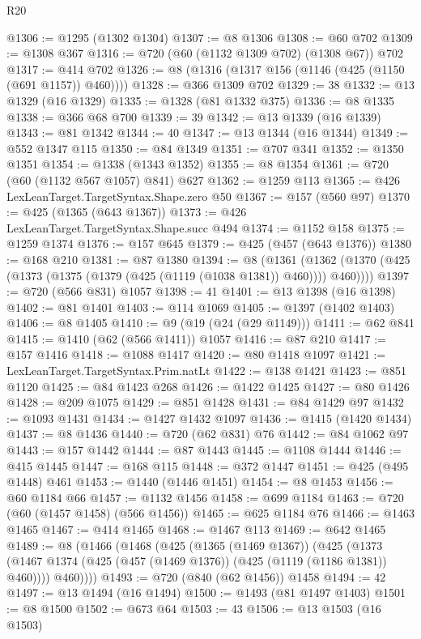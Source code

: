 \begin{lexlean}{R20}
\begin{coremodule}
@1306 := @1295 (@1302 @1304)
@1307 := @8 @1306
@1308 := @60 @702
@1309 := @1308 @367
@1316 := @720 (@60 (@1132 @1309 @702) (@1308 @67)) @702
@1317 := @414 @702
@1326 := @8 (@1316 (@1317 @156 (@1146 (@425 (@1150 (@691 @1157)) @460))))
@1328 := @366 @1309 @702
@1329 := 38
@1332 := @13 @1329 (@16 @1329)
@1335 := @1328 (@81 @1332 @375)
@1336 := @8 @1335
@1338 := @366 @68 @700
@1339 := 39
@1342 := @13 @1339 (@16 @1339)
@1343 := @81 @1342
@1344 := 40
@1347 := @13 @1344 (@16 @1344)
@1349 := @552 @1347 @115
@1350 := @84 @1349
@1351 := @707 @341
@1352 := @1350 @1351
@1354 := @1338 (@1343 @1352)
@1355 := @8 @1354
@1361 := @720 (@60 (@1132 @567 @1057) @841) @627
@1362 := @1259 @113
@1365 := @426 LexLeanTarget.TargetSyntax.Shape.zero @50
@1367 := @157 (@560 @97)
@1370 := @425 (@1365 (@643 @1367))
@1373 := @426 LexLeanTarget.TargetSyntax.Shape.succ @494
@1374 := @1152 @158
@1375 := @1259 @1374
@1376 := @157 @645
@1379 := @425 (@457 (@643 @1376))
@1380 := @168 @210
@1381 := @87 @1380
@1394 := @8
    (@1361 (@1362 (@1370 (@425 (@1373 (@1375 (@1379 (@425 (@1119 (@1038 @1381)) @460)))) @460))))
@1397 := @720 (@566 @831) @1057
@1398 := 41
@1401 := @13 @1398 (@16 @1398)
@1402 := @81 @1401
@1403 := @114 @1069
@1405 := @1397 (@1402 @1403)
@1406 := @8 @1405
@1410 := @9 (@19 (@24 (@29 @1149)))
@1411 := @62 @841
@1415 := @1410 (@62 (@566 @1411)) @1057
@1416 := @87 @210
@1417 := @157 @1416
@1418 := @1088 @1417
@1420 := @80 @1418 @1097
@1421 := LexLeanTarget.TargetSyntax.Prim.natLt
@1422 := @138 @1421
@1423 := @851 @1120
@1425 := @84 @1423 @268
@1426 := @1422 @1425
@1427 := @80 @1426
@1428 := @209 @1075
@1429 := @851 @1428
@1431 := @84 @1429 @97
@1432 := @1093 @1431
@1434 := @1427 @1432 @1097
@1436 := @1415 (@1420 @1434)
@1437 := @8 @1436
@1440 := @720 (@62 @831) @76
@1442 := @84 @1062 @97
@1443 := @157 @1442
@1444 := @87 @1443
@1445 := @1108 @1444
@1446 := @415 @1445
@1447 := @168 @115
@1448 := @372 @1447
@1451 := @425 (@495 @1448) @461
@1453 := @1440 (@1446 @1451)
@1454 := @8 @1453
@1456 := @60 @1184 @66
@1457 := @1132 @1456
@1458 := @699 @1184
@1463 := @720 (@60 (@1457 @1458) (@566 @1456))
@1465 := @625 @1184 @76
@1466 := @1463 @1465
@1467 := @414 @1465
@1468 := @1467 @113
@1469 := @642 @1465
@1489 := @8
    (@1466
      (@1468
        (@425
          (@1365 (@1469 @1367))
          (@425
            (@1373 (@1467 @1374 (@425 (@457 (@1469 @1376)) (@425 (@1119 (@1186 @1381)) @460))))
            @460))))
@1493 := @720 (@840 (@62 @1456)) @1458
@1494 := 42
@1497 := @13 @1494 (@16 @1494)
@1500 := @1493 (@81 @1497 @1403)
@1501 := @8 @1500
@1502 := @673 @64
@1503 := 43
@1506 := @13 @1503 (@16 @1503)

\end{coremodule}
\end{lexlean}
